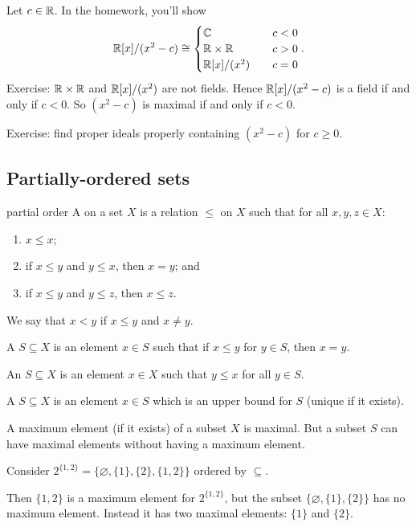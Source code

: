 \documentclass[12pt,letterpaper]{report}
\begin{document}
\begin{ex}
  Let $c \in \mathbb{R}$.
  In the homework, you'll show
  \[
    \mathbb{R}[x]/(x^2 - c) \cong \begin{cases}
      \mathbb{C} & c < 0 \\
      \mathbb{R} \times \mathbb{R} & c > 0 \\
      \mathbb{R}[x]/(x^2) \quad & c = 0
    \end{cases}.
  \]
  Exercise: $\mathbb{R} \times \mathbb{R}$ and $\mathbb{R}[x]/(x^2)$ are not fields.
  Hence $\mathbb{R}[x]/(x^2 - c)$ is a field if and only if $c < 0$.
  So $(x^2 - c)$ is maximal if and only if $c < 0$.

  Exercise: find proper ideals properly containing $(x^2 - c)$ for $c \geq 0$.
\end{ex}

\pagebreak
\subsection{Partially-ordered sets}

\begin{defn}{partial order}{}
  A  on a set $X$ is a relation $\leq$ on $X$ such that for all
  $x, y, z \in X$:
  \begin{enumerate}
    \item $x \leq x$;
    \item if $x \leq y$ and $y \leq x$, then $x = y$; and
    \item if $x \leq y$ and $y \leq z$, then $x \leq z$.
  \end{enumerate}
  We say that $x < y$ if $x \leq y$ and $x \neq y$.

  A  $S \subseteq X$ is an element $x \in S$ such that if
  $x \leq y$ for $y \in S$, then $x = y$.

  An  $S \subseteq X$ is an element $x \in X$ such that $y \leq x$
  for all $y \in S$.

  A  $S \subseteq X$ is an element $x \in S$ which is an upper
  bound for $S$ (unique if it exists).
\end{defn}

A maximum element (if it exists) of a subset $X$ is maximal.
But a subset $S$ can have maximal elements without having a maximum element.

\begin{ex}
  Consider $2^{\{1, 2\}} = \{\varnothing, \{1\}, \{2\}, \{1, 2\}\}$ ordered by $\subseteq$.

  Then $\{1, 2\}$ is a maximum element for $2^{\{1, 2\}}$, but the subset
  $\{\varnothing, \{1\}, \{2\}\}$ has no maximum element.
  Instead it has two maximal elements: $\{1\}$ and $\{2\}$.
\end{ex}
\end{document}
